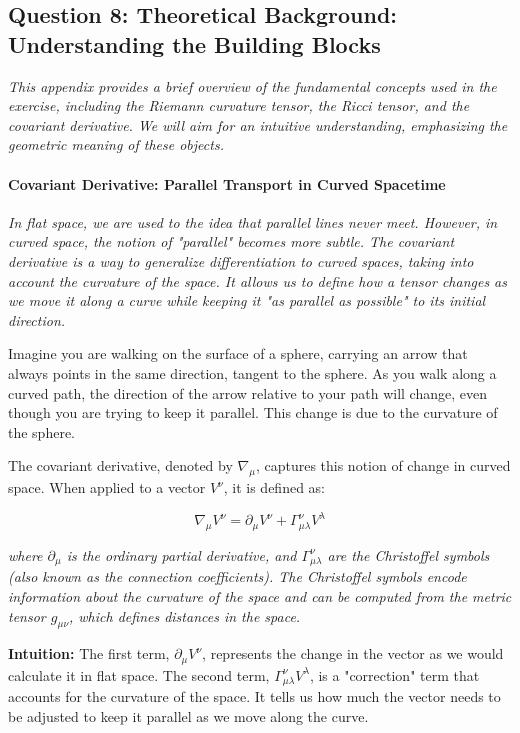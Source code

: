 \documentclass{article}
\begin{document}
\subsection*{Question 8: Theoretical Background: Understanding the Building Blocks}

\textit{This appendix provides a brief overview of the fundamental concepts used in the exercise, including the Riemann curvature tensor, the Ricci tensor, and the covariant derivative. We will aim for an intuitive understanding, emphasizing the geometric meaning of these objects.}

\paragraph{Covariant Derivative: Parallel Transport in Curved Spacetime}

\textit{In flat space, we are used to the idea that parallel lines never meet. However, in curved space, the notion of "parallel" becomes more subtle. The covariant derivative is a way to generalize differentiation to curved spaces, taking into account the curvature of the space. It allows us to define how a tensor changes as we move it along a curve while keeping it "as parallel as possible" to its initial direction.}

Imagine you are walking on the surface of a sphere, carrying an arrow that always points in the same direction, tangent to the sphere. As you walk along a curved path, the direction of the arrow relative to your path will change, even though you are trying to keep it parallel. This change is due to the curvature of the sphere.

The covariant derivative, denoted by \(\nabla_{\mu}\), captures this notion of change in curved space. When applied to a vector \(V^\nu\), it is defined as:

\[
\nabla_{\mu} V^\nu = \partial_{\mu} V^\nu + \Gamma^\nu_{\mu\lambda} V^\lambda
\]

\textit{where \(\partial_{\mu}\) is the ordinary partial derivative, and \(\Gamma^\nu_{\mu\lambda}\) are the Christoffel symbols (also known as the connection coefficients). The Christoffel symbols encode information about the curvature of the space and can be computed from the metric tensor \(g_{\mu\nu}\), which defines distances in the space.}

\textbf{Intuition:} The first term, \(\partial_{\mu} V^\nu\), represents the change in the vector as we would calculate it in flat space. The second term, \(\Gamma^\nu_{\mu\lambda} V^\lambda\), is a "correction" term that accounts for the curvature of the space. It tells us how much the vector needs to be adjusted to keep it parallel as we move along the curve.
\end{document}
